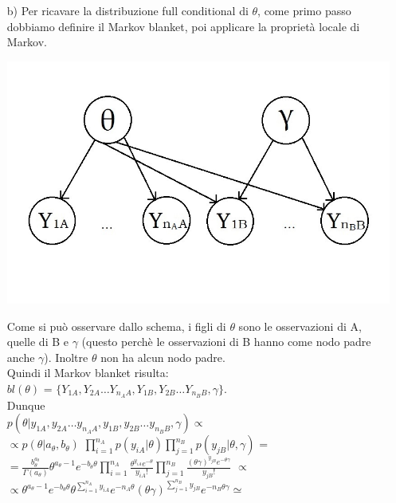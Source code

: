 \begin{enumerate}
\item [b)]
Per ricavare la distribuzione full conditional di $\theta$, come primo passo dobbiamo definire il Markov blanket, poi applicare la proprietà locale di Markov.
\\

\begin{center}
\includegraphics[scale=0.4]{img/esercizio6-01-grafo61.jpg}
\end{center}

Come si può osservare dallo schema, i figli di $\theta$ sono le osservazioni di A, quelle di B e $\gamma$ (questo perchè le osservazioni di B hanno come nodo padre anche $\gamma$). Inoltre $\theta$ non ha alcun nodo padre. \\
Quindi il Markov blanket risulta: \\
$bl(\theta)$ = $\lbrace Y_{1A}, Y_{2A} \ldots Y_{n_AA}, Y_{1B}, Y_{2B} \ldots Y_{n_BB}, \gamma\rbrace$.\\

Dunque\\
$p(\theta|y_{1A}, y_{2A} \ldots y_{n_AA}, y_{1B}, y_{2B} \ldots y_{n_BB}, \gamma) \propto$\\

$\propto p(\theta|a_\theta, b_\theta)$ $\prod_{i=1}^{n_A}{p(y_{iA}|\theta)} \prod_{j=1}^{n_B}{p(y_{jB}|\theta, \gamma)}$ =\\

$ = \frac{b_\theta^{a_\theta}}{\Gamma(a_\theta)}\theta^{a_\theta-1}e^{-b_\theta\theta} \prod_{i=1}^{n_A}{\frac{\theta^{y_{iA}} e^{-\theta}}{y_{iA}!}} \prod_{j=1}^{n_B}{\frac{(\theta\gamma)^{y_{jB}}e^{-\theta\gamma}}{y_{jB}!}}$ $\propto$\\

$\propto \theta^{a_\theta-1}e^{-b_\theta\theta}\theta^{\sum_{i=1}^{n_A}{y_{iA}}}e^{-n_A\theta}(\theta\gamma)^{\sum_{j=1}^{n_B}{y_{jB}}}e^{-n_B\theta\gamma}\simeq$\\


\end{enumerate}
